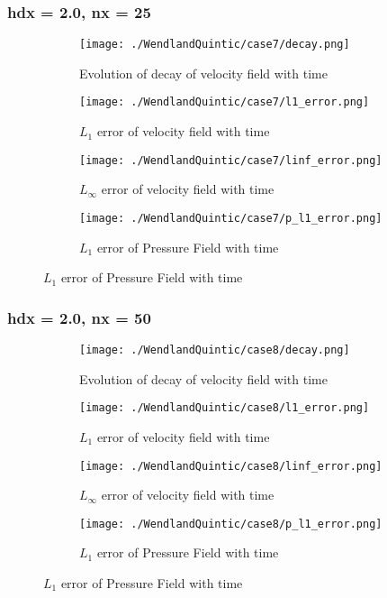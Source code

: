 \documentclass[11pt, a4paper]{article}
\begin{document}
\subsubsection{hdx = 2.0, nx = 25}
\begin{figure}[H]
\begin{subfigure}{0.48\textwidth}
\texttt{[image: ./WendlandQuintic/case7/decay.png]}
\caption{Evolution of decay of velocity field with time}
\end{subfigure}
\begin{subfigure}{0.48\textwidth}
\texttt{[image: ./WendlandQuintic/case7/l1\_error.png]}
\caption{$L_1$ error of velocity field with time}
\end{subfigure}
\medskip
\begin{subfigure}{0.48\textwidth}
\texttt{[image: ./WendlandQuintic/case7/linf\_error.png]}
\caption{$L_\infty$ error of velocity field with time}
\end{subfigure}
\begin{subfigure}{0.48\textwidth}
\texttt{[image: ./WendlandQuintic/case7/p\_l1\_error.png]}
\caption{$L_1$ error of Pressure Field with time}
\end{subfigure}
\end{figure}

\subsubsection{hdx = 2.0, nx = 50}
\begin{figure}[H]
\begin{subfigure}{0.48\textwidth}
\texttt{[image: ./WendlandQuintic/case8/decay.png]}
\caption{Evolution of decay of velocity field with time}
\end{subfigure}
\begin{subfigure}{0.48\textwidth}
\texttt{[image: ./WendlandQuintic/case8/l1\_error.png]}
\caption{$L_1$ error of velocity field with time}
\end{subfigure}
\medskip
\begin{subfigure}{0.48\textwidth}
\texttt{[image: ./WendlandQuintic/case8/linf\_error.png]}
\caption{$L_\infty$ error of velocity field with time}
\end{subfigure}
\begin{subfigure}{0.48\textwidth}
\texttt{[image: ./WendlandQuintic/case8/p\_l1\_error.png]}
\caption{$L_1$ error of Pressure Field with time}
\end{subfigure}
\end{figure}
\end{document}
